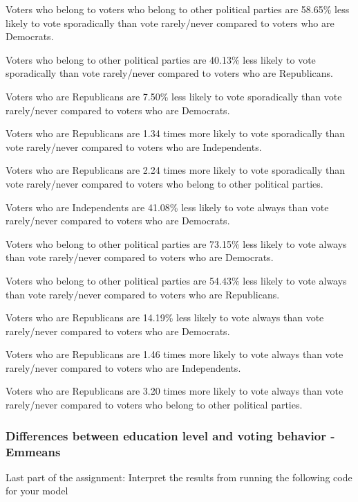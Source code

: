 \documentclass[
  letterpaper,
  DIV=11,
  numbers=noendperiod]{scrartcl}
\begin{document}
Voters who belong to voters who belong to other political parties are
58.65\% less likely to vote sporadically than vote rarely/never compared
to voters who are Democrats.

Voters who belong to other political parties are 40.13\% less likely to
vote sporadically than vote rarely/never compared to voters who are
Republicans.

Voters who are Republicans are 7.50\% less likely to vote sporadically
than vote rarely/never compared to voters who are Democrats.

Voters who are Republicans are 1.34 times more likely to vote
sporadically than vote rarely/never compared to voters who are
Independents.

Voters who are Republicans are 2.24 times more likely to vote
sporadically than vote rarely/never compared to voters who belong to
other political parties.

Voters who are Independents are 41.08\% less likely to vote always than
vote rarely/never compared to voters who are Democrats.

Voters who belong to other political parties are 73.15\% less likely to
vote always than vote rarely/never compared to voters who are Democrats.

Voters who belong to other political parties are 54.43\% less likely to
vote always than vote rarely/never compared to voters who are
Republicans.

Voters who are Republicans are 14.19\% less likely to vote always than
vote rarely/never compared to voters who are Democrats.

Voters who are Republicans are 1.46 times more likely to vote always
than vote rarely/never compared to voters who are Independents.

Voters who are Republicans are 3.20 times more likely to vote always
than vote rarely/never compared to voters who belong to other political
parties.

\subsubsection{Differences between education level and voting behavior -
Emmeans}\label{differences-between-education-level-and-voting-behavior---emmeans}

Last part of the assignment: Interpret the results from running the
following code for your model
\end{document}
